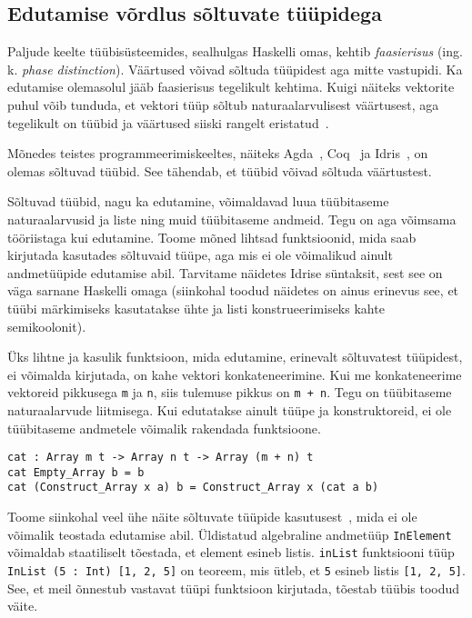 \documentclass[12pt]{article}
\begin{document}
    \subsection{Edutamise võrdlus sõltuvate tüüpidega}\label{soltuvad}
      Paljude keelte tüübisüsteemides, sealhulgas Haskelli omas, kehtib \textit{faasierisus} (ing. k. \textit{phase distinction}). Väärtused võivad sõltuda tüüpidest aga mitte vastupidi. Ka edutamise olemasolul jääb faasierisus tegelikult kehtima. Kuigi näiteks vektorite puhul võib tunduda, et vektori tüüp sõltub naturaalarvulisest väärtusest, aga tegelikult on tüübid ja väärtused siiski rangelt eristatud~\cite{Giv}.

      Mõnedes teistes programmeerimiskeeltes, näiteks Agda~\cite{Agd}, Coq~\cite{The_Coq} ja Idris~\cite{The_Idr}, on olemas sõltuvad tüübid. See tähendab, et tüübid võivad sõltuda väärtustest.

      Sõltuvad tüübid, nagu ka edutamine, võimaldavad luua tüübitaseme naturaalarvusid ja liste ning muid tüübitaseme andmeid. Tegu on aga võimsama tööriistaga kui edutamine. Toome mõned lihtsad funktsioonid, mida saab kirjutada kasutades sõltuvaid tüüpe, aga mis ei ole võimalikud ainult andmetüüpide edutamise abil. Tarvitame näidetes Idrise süntaksit, sest see on väga sarnane Haskelli omaga (siinkohal toodud näidetes on ainus erinevus see, et tüübi märkimiseks kasutatakse ühte ja listi konstrueerimiseks kahte semikoolonit).

      Üks lihtne ja kasulik funktsioon, mida edutamine, erinevalt sõltuvatest tüüpidest, ei võimalda kirjutada, on kahe vektori konkateneerimine. Kui me konkateneerime vektoreid pikkusega \verb!m! ja \verb!n!, siis tulemuse pikkus on \verb!m + n!. Tegu on tüübitaseme naturaalarvude liitmisega. Kui edutatakse ainult tüüpe ja konstruktoreid, ei ole tüübitaseme andmetele võimalik rakendada funktsioone.

      \begin{verbatim}cat : Array m t -> Array n t -> Array (m + n) t
cat Empty_Array b = b
cat (Construct_Array x a) b = Construct_Array x (cat a b)\end{verbatim}

      Toome siinkohal veel ühe näite sõltuvate tüüpide kasutusest~\cite{The_Idr}, mida ei ole võimalik teostada edutamise abil. Üldistatud algebraline andmetüüp \verb!InElement! võimaldab staatiliselt tõestada, et element esineb listis. \verb!inList! funktsiooni tüüp \verb!InList (5 : Int) [1, 2, 5]! on teoreem, mis ütleb, et \verb!5! esineb listis \verb![1, 2, 5]!. See, et meil õnnestub vastavat tüüpi funktsioon kirjutada, tõestab tüübis toodud väite.
\end{document}
